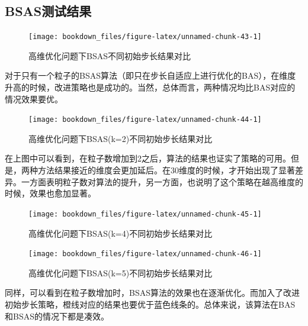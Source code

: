 \documentclass[]{ctexbook}
\begin{document}
\subsection{BSAS测试结果}\label{bsas}

\begin{figure}

{\centering \texttt{[image: bookdown\_files/figure-latex/unnamed-chunk-43-1]} 

}

\caption{高维优化问题下BSAS不同初始步长结果对比}\label{fig:unnamed-chunk-43}
\end{figure}

对于只有一个粒子的BSAS算法（即只在步长自适应上进行优化的BAS），在维度升高的时候，改进策略也是成功的。当然，总体而言，两种情况均比BAS对应的情况效果要优。

\begin{figure}

{\centering \texttt{[image: bookdown\_files/figure-latex/unnamed-chunk-44-1]} 

}

\caption{高维优化问题下BSAS(k=2)不同初始步长结果对比}\label{fig:unnamed-chunk-44}
\end{figure}

在上图中可以看到，在粒子数增加到2之后，算法的结果也证实了策略的可用。但是，两种方法结果接近的维度会更加延后。在30维度的时候，才开始出现了显著差异。一方面表明粒子数对算法的提升，另一方面，也说明了这个策略在越高维度的时候，效果也愈加显著。

\begin{figure}

{\centering \texttt{[image: bookdown\_files/figure-latex/unnamed-chunk-45-1]} 

}

\caption{高维优化问题下BSAS(k=4)不同初始步长结果对比}\label{fig:unnamed-chunk-45}
\end{figure}

\begin{figure}

{\centering \texttt{[image: bookdown\_files/figure-latex/unnamed-chunk-46-1]} 

}

\caption{高维优化问题下BSAS(k=5)不同初始步长结果对比}\label{fig:unnamed-chunk-46}
\end{figure}

同样，可以看到在粒子数增加时，BSAS算法的效果也在逐渐优化。而加入了改进初始步长策略，橙线对应的结果也要优于蓝色线条的。总体来说，该算法在BAS和BSAS的情况下都是凑效。
\end{document}
